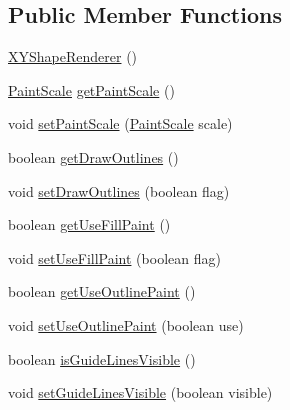 \subsection*{Public Member Functions}
\begin{DoxyCompactItemize}
\item 
\mbox{\hyperlink{classorg_1_1jfree_1_1chart_1_1renderer_1_1xy_1_1_x_y_shape_renderer_a9b8d1fb63a608d326b02490dd182cd7e}{X\+Y\+Shape\+Renderer}} ()
\item 
\mbox{\hyperlink{interfaceorg_1_1jfree_1_1chart_1_1renderer_1_1_paint_scale}{Paint\+Scale}} \mbox{\hyperlink{classorg_1_1jfree_1_1chart_1_1renderer_1_1xy_1_1_x_y_shape_renderer_acff77b51f55ea437162422848a8c8076}{get\+Paint\+Scale}} ()
\item 
void \mbox{\hyperlink{classorg_1_1jfree_1_1chart_1_1renderer_1_1xy_1_1_x_y_shape_renderer_af7e7956fd96ef26631f654507b95c5d9}{set\+Paint\+Scale}} (\mbox{\hyperlink{interfaceorg_1_1jfree_1_1chart_1_1renderer_1_1_paint_scale}{Paint\+Scale}} scale)
\item 
boolean \mbox{\hyperlink{classorg_1_1jfree_1_1chart_1_1renderer_1_1xy_1_1_x_y_shape_renderer_a2dcf93065d4bc5dfb716e6b5a9d4ddb5}{get\+Draw\+Outlines}} ()
\item 
void \mbox{\hyperlink{classorg_1_1jfree_1_1chart_1_1renderer_1_1xy_1_1_x_y_shape_renderer_aa544ccd4f173a8bab5765f35efcc10b4}{set\+Draw\+Outlines}} (boolean flag)
\item 
boolean \mbox{\hyperlink{classorg_1_1jfree_1_1chart_1_1renderer_1_1xy_1_1_x_y_shape_renderer_a14c6842a6a18201e77ee596c41c7b726}{get\+Use\+Fill\+Paint}} ()
\item 
void \mbox{\hyperlink{classorg_1_1jfree_1_1chart_1_1renderer_1_1xy_1_1_x_y_shape_renderer_ac667b765f06546dd66014cb19de5c73a}{set\+Use\+Fill\+Paint}} (boolean flag)
\item 
boolean \mbox{\hyperlink{classorg_1_1jfree_1_1chart_1_1renderer_1_1xy_1_1_x_y_shape_renderer_ac0eba297f026e0ee631ae48054e0f103}{get\+Use\+Outline\+Paint}} ()
\item 
void \mbox{\hyperlink{classorg_1_1jfree_1_1chart_1_1renderer_1_1xy_1_1_x_y_shape_renderer_adbe35144935f7f1a672617d4b5564db9}{set\+Use\+Outline\+Paint}} (boolean use)
\item 
boolean \mbox{\hyperlink{classorg_1_1jfree_1_1chart_1_1renderer_1_1xy_1_1_x_y_shape_renderer_a34e6023b51701e33b663b29b910c22d7}{is\+Guide\+Lines\+Visible}} ()
\item 
void \mbox{\hyperlink{classorg_1_1jfree_1_1chart_1_1renderer_1_1xy_1_1_x_y_shape_renderer_acc952376b7b01c311a047bbd6ecde93a}{set\+Guide\+Lines\+Visible}} (boolean visible)

\end{DoxyCompactItemize}
